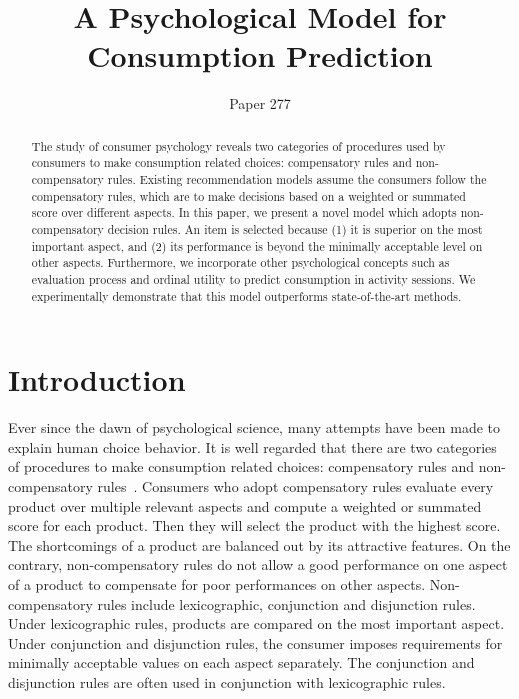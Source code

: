 \documentclass[sigconf]{acmart}
\begin{document}
\title{A Psychological Model for Consumption Prediction}


\author{Paper 277}


\begin{abstract}
The study of consumer psychology reveals two categories of procedures used by consumers to make consumption related choices: compensatory rules and non-compensatory rules. Existing recommendation models assume the consumers follow the compensatory rules, which are to make decisions based on a weighted or summated score over different aspects. In this paper, we present a novel model which adopts non-compensatory decision rules. An item is selected because  (1) it is superior on the most important aspect, and (2) its performance is beyond the minimally acceptable level on other aspects. Furthermore, we incorporate other psychological concepts such as evaluation process and ordinal utility to predict consumption in activity sessions. We experimentally demonstrate that this model outperforms state-of-the-art methods.
\end{abstract}




\maketitle
\section{Introduction}\label{sec:introduction}


Ever since the dawn of psychological science, many attempts have been made to explain human choice behavior. It is well regarded that there are two categories of procedures to make consumption related choices: compensatory rules and non-compensatory rules~\cite{Engel1986Consumer}. Consumers who adopt compensatory rules evaluate every product over multiple relevant aspects and compute a weighted or summated score for each product. Then they will select the product with the highest score. The shortcomings of a product are balanced out by its attractive features. On the contrary, non-compensatory rules do not allow a good performance on one aspect of a product to compensate for poor performances on other aspects. Non-compensatory rules include lexicographic, conjunction and disjunction rules. Under lexicographic rules, products are compared on the most important aspect. Under conjunction and disjunction rules, the consumer imposes requirements for minimally acceptable values on each aspect separately. The conjunction and disjunction rules are often used in conjunction with lexicographic rules.
\end{document}
